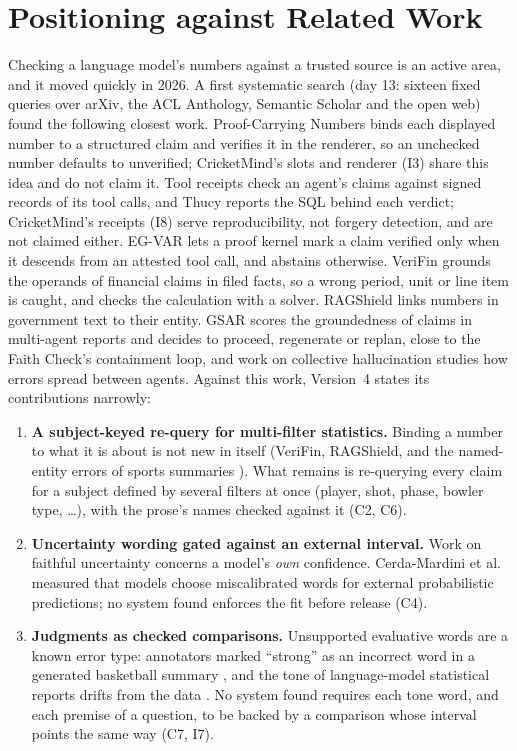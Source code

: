 \documentclass[11pt,a4paper]{article}
\begin{document}
\section{Positioning against Related Work}

Checking a language model's numbers against a trusted source is an active area,
and it moved quickly in 2026. A first systematic search (day 13: sixteen fixed
queries over arXiv, the ACL Anthology, Semantic Scholar and the open web) found
the following closest work. Proof-Carrying Numbers \cite{pcn} binds each
displayed number to a structured claim and verifies it in the renderer, so an
unchecked number defaults to unverified; CricketMind's slots and renderer (I3)
share this idea and do not claim it. Tool receipts \cite{receipts} check an
agent's claims against signed records of its tool calls, and Thucy
\cite{thucy} reports the SQL behind each verdict; CricketMind's receipts (I8)
serve reproducibility, not forgery detection, and are not claimed either. EG-VAR
\cite{egvar} lets a proof kernel mark a claim verified only when it descends from
an attested tool call, and abstains otherwise. VeriFin \cite{verifin} grounds
the operands of financial claims in filed facts, so a wrong period, unit or line
item is caught, and checks the calculation with a solver. RAGShield
\cite{ragshield} links numbers in government text to their entity. GSAR
\cite{gsar} scores the groundedness of claims in multi-agent reports and decides
to proceed, regenerate or replan, close to the Faith Check's containment loop,
and work on collective hallucination \cite{collective} studies how errors spread
between agents. Against this work, Version~4 states its contributions narrowly:

\begin{enumerate}[nosep,leftmargin=1.6em]
\item \textbf{A subject-keyed re-query for multi-filter statistics.} Binding a
  number to what it is about is not new in itself (VeriFin, RAGShield, and the
  named-entity errors of sports summaries \cite{thomson}). What remains is
  re-querying every claim for a subject defined by several filters at once
  (player, shot, phase, bowler type, \ldots), with the prose's names checked
  against it (C2, C6).
\item \textbf{Uncertainty wording gated against an external interval.} Work on
  faithful uncertainty \cite{lin2022,wang2024,yona2024} concerns a model's
  \emph{own} confidence. Cerda-Mardini et al.\ \cite{riskcomm} measured that
  models choose miscalibrated words for external probabilistic predictions; no
  system found enforces the fit before release (C4).
\item \textbf{Judgments as checked comparisons.} Unsupported evaluative words
  are a known error type: annotators marked ``strong'' as an incorrect word in a
  generated basketball summary \cite{thomson}, and the tone of language-model
  statistical reports drifts from the data \cite{tonal}. No system found requires
  each tone word, and each premise of a question, to be backed by a comparison
  whose interval points the same way (C7, I7).
\end{enumerate}
\end{document}

